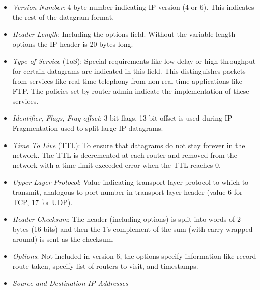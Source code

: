 \documentclass[a4paper]{article}
\theoremstyle{plain}
\theoremstyle{definition}
\begin{document}
\begin{itemize}
    \item \textit{Version Number}: 4 byte number indicating IP version (4 or 6). This indicates the rest of the datagram format.
    
    \item \textit{Header Length}: Including the options field. Without the variable-length options the IP header is 20 bytes long. 
    
    \item \textit{Type of Service} (ToS): Special requirements like low delay or high throughput for certain datagrams are indicated in this field. This distinguishes packets from services like real-time telephony from non real-time applications like FTP. The policies set by router admin indicate the implementation of these services. 
    
    \item \textit{Identifier, Flags, Frag offset}: 3 bit flags, 13 bit offset is used during IP Fragmentation used to split large IP datagrams.
    
    \item \textit{Time To Live} (TTL): To ensure that datagrams do not stay forever in the network. The TTL is decremented at each router and removed from the network with a time limit exceeded error when the TTL reaches 0.
    
    \item \textit{Upper Layer Protocol}: Value indicating transport layer protocol to which to transmit, analogous to port number in transport layer header (value 6 for TCP, 17 for UDP). 
    
    \item \textit{Header Checksum}: The header (including options) is split into words of 2 bytes (16 bits) and then the 1's complement of the sum (with carry wrapped around) is sent as the checksum. 
    
    \item \textit{Options}: Not included in version 6, the options specify information like record route taken, specify list of routers to visit, and timestamps. 
    
    \item \textit{Source and Destination IP Addresses}
\end{itemize}
\end{document}
